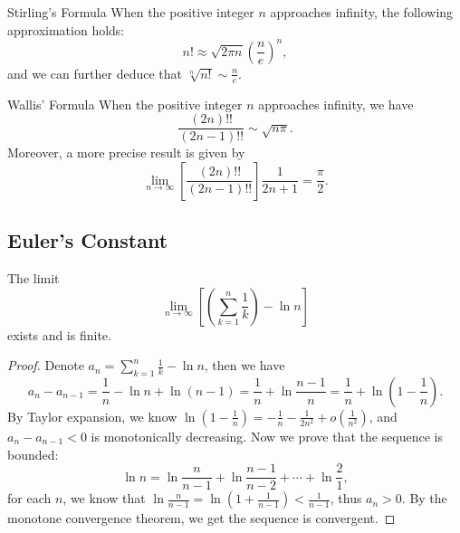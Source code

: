 \begin{theorem}{Stirling's Formula}{}
  When the positive integer $n$ approaches infinity,
  the following approximation holds:
  \begin{equation}
    n! \approx \sqrt{2\pi n} \left( \frac{n}{e} \right)^n,
  \end{equation}
  and we can further deduce that $\sqrt[n]{n!} \sim \frac{n}{e}$.
\end{theorem}

\begin{theorem}{Wallis' Formula}{}
  When the positive integer $n$ approaches infinity,
  we have
  \begin{equation}
    \frac{(2n)!!}{(2n - 1)!!} \sim \sqrt{n \pi}.
  \end{equation}
  Moreover, a more precise result is given by
  \begin{equation}
    \lim \limits _{n \rightarrow \infty} \left[
      \frac{(2n)!!}{(2n - 1)!!}
    \right]\frac{1}{2n+1} = \frac{\pi}{2}.
  \end{equation}
\end{theorem}

\subsection{Euler's Constant}

\begin{lemma}{}{}
  The limit
  \begin{equation}
    \lim \limits _{n \rightarrow \infty}
  \left[ (\sum\limits_{k = 1}^n \frac{1}{k}) - \ln n \right]
  \end{equation}
  exists and is finite.
\end{lemma}

\begin{proof}
  Denote $a_n = \sum\limits_{k = 1}^n \frac{1}{k} - \ln n$,
  then we have
  \begin{equation}
    a_n - a_{n-1} = \frac{1}{n} - \ln n + \ln (n-1) = \frac{1}{n} + \ln \frac{n-1}{n} = \frac{1}{n} + \ln (1 - \frac{1}{n}).
  \end{equation}
  By Taylor expansion, we know $\ln (1 - \frac{1}{n}) = - \frac{1}{n} -
  \frac{1}{2n^2} + o(\frac{1}{n^2})$,
  and $a_n - a_{n-1} < 0$ is monotonically decreasing.
  Now we prove that the sequence is bounded:
  \begin{equation}
    \ln n = \ln \frac{n}{n-1} + \ln \frac{n-1}{n-2} + \cdots + \ln \frac{2}{1},
  \end{equation}
  for each $n$, we know that $\ln \frac{n}{n-1} = \ln (1 + \frac{1}{n-1}) <
  \frac{1}{n-1}$,
  thus $a_n > 0$.
  By the monotone convergence theorem, we get the sequence is convergent.
\end{proof}

